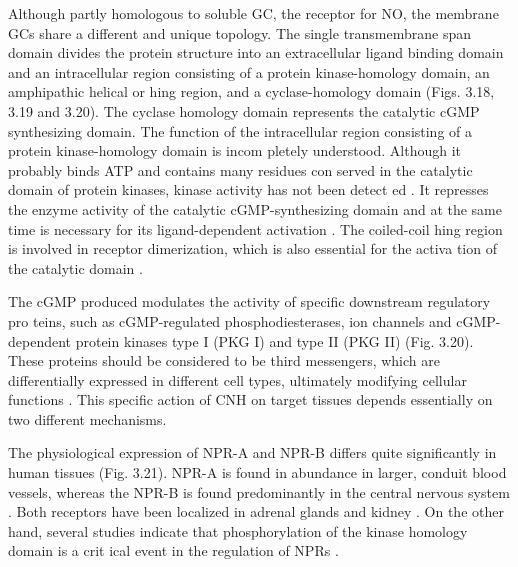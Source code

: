 \documentclass[14pt,a4paper,onecolumn]{extarticle}
\begin{document}
Although partly homologous to soluble GC, the receptor for NO, the membrane GCs share a different and unique topology. The single transmembrane span domain divides the protein structure into an extracellular ligand binding domain and an intracellular region consisting of a protein kinase-homology domain, an amphipathic helical or hing region, and a cyclase-homology domain \citep{165} (Figs. 3.18, 3.19 and 3.20). The cyclase homology domain represents the catalytic cGMP synthesizing domain. The function of the intracellular region consisting of a protein kinase-homology domain is incom pletely understood. Although it probably binds ATP and contains many residues con served in the catalytic domain of protein kinases, kinase activity has not been detect ed \citep{165}. It represses the enzyme activity of the catalytic cGMP-synthesizing domain and at the same time is necessary for its ligand-dependent activation \citep{154}. The coiled-coil hing region is involved in receptor dimerization, which is also essential for the activa tion of the catalytic domain \citep{165}.

The cGMP produced modulates the activity of specific downstream regulatory pro teins, such as cGMP-regulated phosphodiesterases, ion channels and cGMP-dependent protein kinases type I (PKG I) and type II (PKG II) (Fig. 3.20). These proteins should be considered to be third messengers, which are differentially expressed in different cell types, ultimately modifying cellular functions \citep{166} \citep{167}. This specific action of CNH on target tissues depends essentially on two different mechanisms.

The physiological expression of NPR-A and NPR-B differs quite significantly in human tissues (Fig. 3.21). NPR-A is found in abundance in larger, conduit blood vessels, whereas the NPR-B is found predominantly in the central nervous system \citep{168}. Both receptors have been localized in adrenal glands and kidney \citep{168}. On the other hand, several studies indicate that phosphorylation of the kinase homology domain is a crit ical event in the regulation of NPRs \citep{169} \citep{170} \citep{171}.
\end{document}
